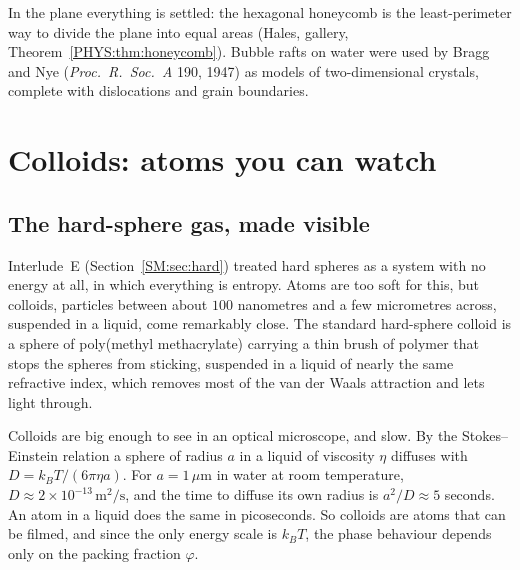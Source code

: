 \documentclass[11pt,openany]{book}
\theoremstyle{plain}
\theoremstyle{definition}
\theoremstyle{remark}
\begin{document}
In the plane everything is settled: the hexagonal honeycomb is the least-perimeter way to divide the
plane into equal areas (Hales, gallery, Theorem~\ref{PHYS:thm:honeycomb}). Bubble rafts on water were
used by Bragg and Nye (\emph{Proc.\ R.\ Soc.\ A} 190, 1947) as models of two-dimensional crystals, complete with
dislocations and grain boundaries.

\section{Colloids: atoms you can watch}
\label{PHYS:sec:colloids}

\subsection*{The hard-sphere gas, made visible}
Interlude~E (Section~\ref{SM:sec:hard}) treated hard spheres as a system with no energy at all, in which
everything is entropy. Atoms are too soft for this, but colloids, particles between about
$100$ nanometres and a few micrometres across, suspended in a liquid, come remarkably close. The standard
hard-sphere colloid is a sphere of poly(methyl methacrylate) carrying a thin brush of polymer that
stops the spheres from sticking, suspended in a liquid of nearly the same refractive index, which
removes most of the van der Waals attraction and lets light through.

Colloids are big enough to see in an optical microscope, and slow. By the Stokes--Einstein relation a sphere of radius $a$ in a liquid of viscosity $\eta$ diffuses
with $D=k_BT/(6\pi\eta a)$. For $a=1\,\mu$m in water at room temperature,
$D\approx2\times10^{-13}\,\mathrm m^2/\mathrm s$, and the time to diffuse its own radius is $a^2/D\approx5$
seconds. An atom in a liquid does the same in picoseconds. So colloids are atoms that can be filmed, and since
the only energy scale is $k_BT$, the phase behaviour depends only on the packing fraction $\varphi$.
\end{document}
